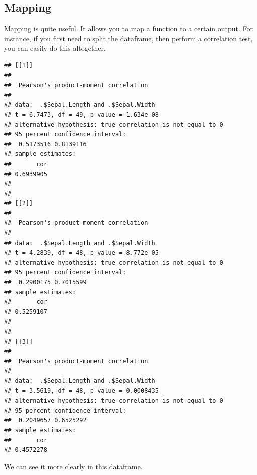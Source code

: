 \documentclass[
]{book}
\newenvironment{Shaded}{\begin{snugshade}}{\end{snugshade}}
\newcommand{\AttributeTok}[1]{\textcolor[rgb]{0.77,0.63,0.00}{#1}}
\newcommand{\CommentTok}[1]{\textcolor[rgb]{0.56,0.35,0.01}{\textit{#1}}}
\newcommand{\FunctionTok}[1]{\textcolor[rgb]{0.00,0.00,0.00}{#1}}
\newcommand{\NormalTok}[1]{#1}
\newcommand{\SpecialCharTok}[1]{\textcolor[rgb]{0.00,0.00,0.00}{#1}}
\begin{document}
\hypertarget{mapping}{%
\subsection{Mapping}\label{mapping}}

Mapping is quite useful.
It allows you to map a function to a certain output.
For instance, if you first need to split the dataframe, then perform a correlation test, you can easily do this altogether.

\begin{Shaded}
\end{Shaded}

\begin{verbatim}
## [[1]]
## 
##  Pearson's product-moment correlation
## 
## data:  .$Sepal.Length and .$Sepal.Width
## t = 6.7473, df = 49, p-value = 1.634e-08
## alternative hypothesis: true correlation is not equal to 0
## 95 percent confidence interval:
##  0.5173516 0.8139116
## sample estimates:
##       cor 
## 0.6939905 
## 
## 
## [[2]]
## 
##  Pearson's product-moment correlation
## 
## data:  .$Sepal.Length and .$Sepal.Width
## t = 4.2839, df = 48, p-value = 8.772e-05
## alternative hypothesis: true correlation is not equal to 0
## 95 percent confidence interval:
##  0.2900175 0.7015599
## sample estimates:
##       cor 
## 0.5259107 
## 
## 
## [[3]]
## 
##  Pearson's product-moment correlation
## 
## data:  .$Sepal.Length and .$Sepal.Width
## t = 3.5619, df = 48, p-value = 0.0008435
## alternative hypothesis: true correlation is not equal to 0
## 95 percent confidence interval:
##  0.2049657 0.6525292
## sample estimates:
##       cor 
## 0.4572278
\end{verbatim}

We can see it more clearly in this dataframe.
\end{document}
